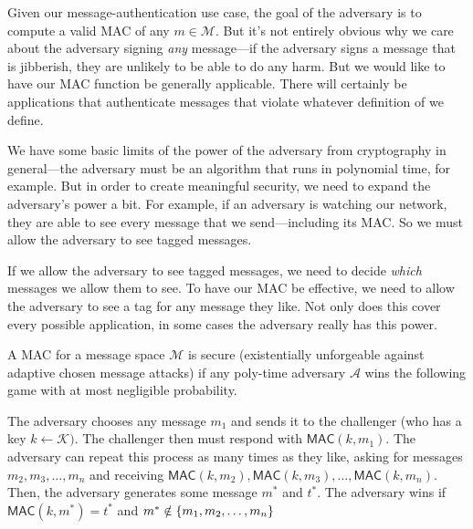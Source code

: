 Given our message-authentication use case, the goal of the adversary is to compute a valid MAC of any $m\in \mathcal{M}$.
But it's not entirely obvious why we care about the adversary signing \textit{any} message---if the adversary signs a message that is jibberish, they are unlikely to be able to do any harm. But we would like to have our MAC function be generally applicable. There will certainly be applications that authenticate messages that violate whatever definition of  we define.

We have some basic limits of the power of the adversary from cryptography in general---the adversary must be an algorithm that runs in polynomial time, for example. But in order to create meaningful security, we need to expand the adversary's power a bit. For example, if an adversary is watching our network, they are able to see every message that we send---including its MAC. So we must allow the adversary to see tagged messages. 

If we allow the adversary to see tagged messages, we need to decide \emph{which} messages we allow them to see. To have our MAC be effective, we need to allow the adversary to see a tag for any message they like. Not only does this cover every possible application, in some cases the adversary really has this power.

\begin{definition}
	A MAC for a message space $\mathcal{M}$ is secure (existentially unforgeable against adaptive chosen message attacks) if any poly-time adversary $\mathcal{A}$ wins the following game with at most negligible probability.

	The adversary chooses any message $m_1$ and sends it to the challenger (who has a key $k \leftarrow \mathcal{K})$. The challenger then must respond with $\mathsf{MAC}(k, m_1)$. The adversary can repeat this process as many times as they like, asking for messages $m_2, m_3, \ldots, m_n$ and receiving $\mathsf{MAC}(k, m_2), \mathsf{MAC}(k, m_3), \ldots, \mathsf{MAC}(k, m_n)$. Then, the adversary generates some message $m^*$ and $t^*$. The adversary wins if $\mathsf{MAC}(k, m^*) = t^*$ and $m^* \notin \left\{ m_1, m_2, \ldots, m_n \right\}$

\end{definition}


